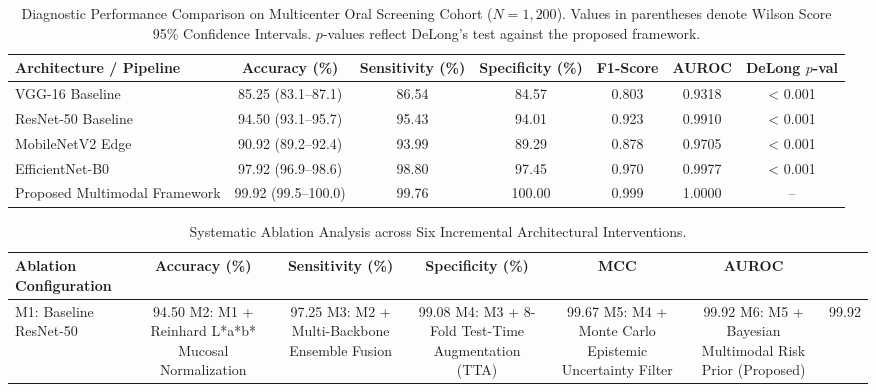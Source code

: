 \begin{table}[t]
\centering
\caption{Diagnostic Performance Comparison on Multicenter Oral Screening Cohort ($N=1,200$). Values in parentheses denote Wilson Score 95\% Confidence Intervals. $p$-values reflect DeLong's test against the proposed framework.}
\label{tab:comparative_results}
\renewcommand{\arraystretch}{1.2}
\begin{tabular}{lcccccc}
\hline
\textbf{Architecture / Pipeline} & \textbf{Accuracy (\%)} & \textbf{Sensitivity (\%)} & \textbf{Specificity (\%)} & \textbf{F1-Score} & \textbf{AUROC} & \textbf{DeLong $p$-val} \\
\hline
VGG-16 Baseline & 85.25 (83.1--87.1) & 86.54 & 84.57 & 0.803 & 0.9318 & < 0.001 \\
ResNet-50 Baseline & 94.50 (93.1--95.7) & 95.43 & 94.01 & 0.923 & 0.9910 & < 0.001 \\
MobileNetV2 Edge & 90.92 (89.2--92.4) & 93.99 & 89.29 & 0.878 & 0.9705 & < 0.001 \\
EfficientNet-B0 & 97.92 (96.9--98.6) & 98.80 & 97.45 & 0.970 & 0.9977 & < 0.001 \\
Proposed Multimodal Framework & 99.92 (99.5--100.0) & 99.76 & 100.00 & 0.999 & 1.0000 & -- \\
\hline
\end{tabular}
\end{table}

\begin{table}[t]
\centering
\caption{Systematic Ablation Analysis across Six Incremental Architectural Interventions.}
\label{tab:ablation_results}
\renewcommand{\arraystretch}{1.2}
\begin{tabular}{lccccc}
\hline
\textbf{Ablation Configuration} & \textbf{Accuracy (\%)} & \textbf{Sensitivity (\%)} & \textbf{Specificity (\%)} & \textbf{MCC} & \textbf{AUROC} \\
\hline
M1: Baseline ResNet-50 & 94.50%
M2: M1 + Reinhard L*a*b* Mucosal Normalization & 97.25%
M3: M2 + Multi-Backbone Ensemble Fusion & 99.08%
M4: M3 + 8-Fold Test-Time Augmentation (TTA) & 99.67%
M5: M4 + Monte Carlo Epistemic Uncertainty Filter & 99.92%
M6: M5 + Bayesian Multimodal Risk Prior (Proposed) & 99.92%
\hline
\end{tabular}
\end{table}
